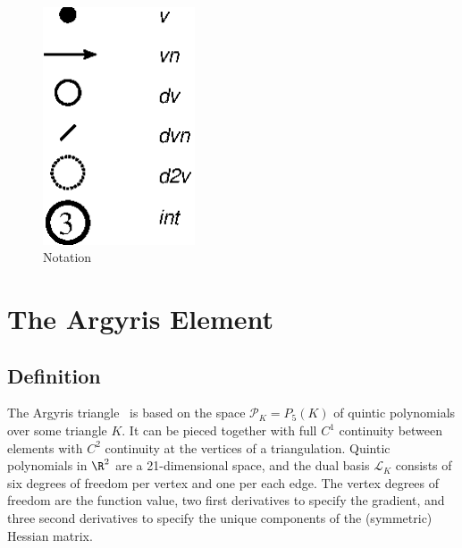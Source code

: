 \begin{figure}[H]
  \hspace{2cm} 
  \includegraphics[width=4.5cm]{chapters/kirby-6/eps/notation.eps}
  \caption{Notation}
  \label{fig:notation}
\end{figure}

\newpage

\section{The Argyris Element}

\subsection{Definition}

The Argyris triangle~\cite{ArgyrisFriedEtAl1968,Ciarlet2002} is based
on the space \(
\mathcal{P}_K = P_5(K) \) of quintic
polynomials over some triangle \( K \).  It can be pieced together
with full \( C^1 \) continuity between elements with \( C^2 \)
continuity at the vertices of a triangulation. Quintic polynomials in
$\R^2$ are a 21-dimensional space, and the dual basis \( \mathcal{L}_K
\) consists of six degrees of freedom per vertex and one per each edge. The vertex
degrees of freedom are the function value, two first derivatives to specify the
gradient, and three second derivatives to specify the unique
components of the (symmetric) Hessian matrix.

